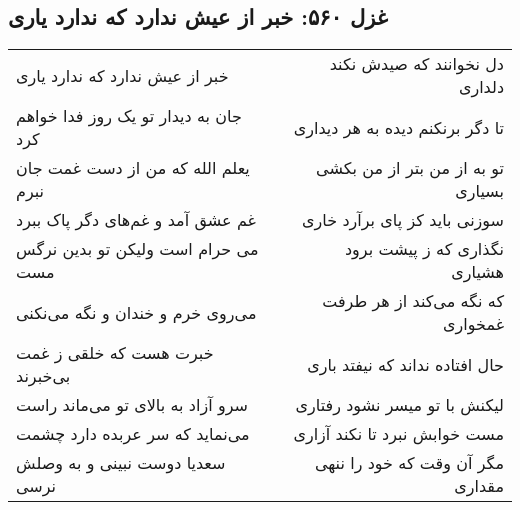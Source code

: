 \begin{center}
\section*{غزل ۵۶۰: خبر از عیش ندارد که ندارد یاری}
\label{sec:560}
\begin{longtable}{l p{0.5cm} r}
خبر از عیش ندارد که ندارد یاری
&&
دل نخوانند که صیدش نکند دلداری
\\
جان به دیدار تو یک روز فدا خواهم کرد
&&
تا دگر برنکنم دیده به هر دیداری
\\
یعلم الله که من از دست غمت جان نبرم
&&
تو به از من بتر از من بکشی بسیاری
\\
غم عشق آمد و غم‌های دگر پاک ببرد
&&
سوزنی باید کز پای برآرد خاری
\\
می حرام است ولیکن تو بدین نرگس مست
&&
نگذاری که ز پیشت برود هشیاری
\\
می‌روی خرم و خندان و نگه می‌نکنی
&&
که نگه می‌کند از هر طرفت غمخواری
\\
خبرت هست که خلقی ز غمت بی‌خبرند
&&
حال افتاده نداند که نیفتد باری
\\
سرو آزاد به بالای تو می‌ماند راست
&&
لیکنش با تو میسر نشود رفتاری
\\
می‌نماید که سر عربده دارد چشمت
&&
مست خوابش نبرد تا نکند آزاری
\\
سعدیا دوست نبینی و به وصلش نرسی
&&
مگر آن وقت که خود را ننهی مقداری
\\
\end{longtable}
\end{center}
